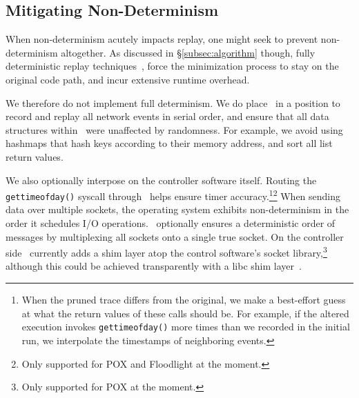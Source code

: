 \subsection{Mitigating Non-Determinism}
\label{subsec:mitigating}

When non-determinism acutely impacts replay, one might seek to prevent non-determinism altogether.
As discussed in \S\ref{subsec:algorithm} though, fully deterministic replay techniques~\cite{Dunlap:2002:REI:844128.844148,Geels:2006:RDD:1267359.1267386},
force the minimization process to stay on the original code path, and incur
extensive runtime overhead.

We therefore do not implement full determinism. We do place \projectname~in a position to
record and replay all network events in serial order, and ensure that all
data structures within \projectname~were unaffected by randomness. For example,
we avoid using hashmaps that hash keys according to their memory address,
and sort all list return values.

We also optionally interpose on the controller software itself.
Routing the {\texttt{gettimeofday()}} syscall through \projectname~helps ensure timer
accuracy.\footnote{When the pruned trace differs from the original, we make a
best-effort guess at what the return values of these calls should be. For example,
if the altered execution invokes {\texttt{gettimeofday()}} more times than we recorded
in the initial run, we interpolate the timestamps of neighboring events.}\footnote{Only
supported for POX and Floodlight at the moment.\label{fn:pox_fl}} When sending data over multiple sockets, the operating system exhibits
non-determinism in the order it schedules I/O operations.
\projectname~optionally ensures a deterministic order of messages
by multiplexing all sockets
onto a single true socket. On the controller side \projectname~currently
adds a shim layer atop the control
software's socket library,\footnote{Only supported for POX at the moment.} although this
could be achieved transparently with a libc shim layer~\cite{Geels:2006:RDD:1267359.1267386}.

